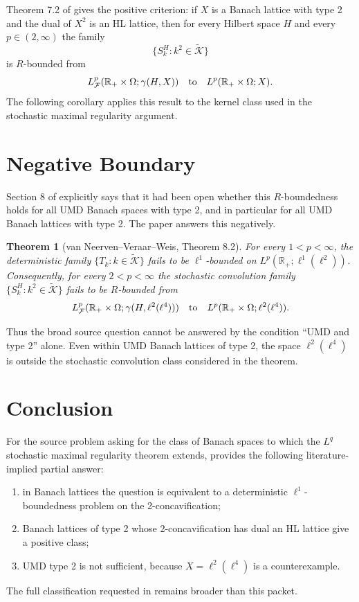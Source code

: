 \documentclass[11pt]{article}
\newtheorem{theorem}{Theorem}
\newcommand{\R}{\mathbb{R}}
\newcommand{\Ktilde}{\widetilde{\mathcal K}}
\begin{document}
Theorem 7.2 of \cite{NVWrbounded} gives the positive criterion: if $X$ is a
Banach lattice with type 2 and the dual of $X^2$ is an HL lattice, then for
every Hilbert space $H$ and every $p\in(2,\infty)$ the family
\[
  \{S_k^H : k^2\in \Ktilde\}
\]
is $R$-bounded from
\[
  L^p_{\mathcal F}(\R_+\times\Omega;\gamma(H,X))
  \quad\hbox{to}\quad
  L^p(\R_+\times\Omega;X).
\]
The following corollary applies this result to the kernel class used in the
stochastic maximal regularity argument.

\section*{Negative Boundary}

Section 8 of \cite{NVWrbounded} explicitly says that it had been open whether
this $R$-boundedness holds for all UMD Banach spaces with type 2, and in
particular for all UMD Banach lattices with type 2. The paper answers this
negatively.

\begin{theorem}[van Neerven--Veraar--Weis, Theorem 8.2]
For every $1<p<\infty$, the deterministic family
$\{T_k:k\in\Ktilde\}$ fails to be $\ell^1$-bounded on
$L^p(\R_+;\ell^1(\ell^2))$. Consequently, for every $2<p<\infty$ the
stochastic convolution family $\{S_k^H:k^2\in\Ktilde\}$ fails to be
$R$-bounded from
\[
  L^p_{\mathcal F}(\R_+\times\Omega;\gamma(H,\ell^2(\ell^4)))
  \quad\hbox{to}\quad
  L^p(\R_+\times\Omega;\ell^2(\ell^4)).
\]
\end{theorem}

Thus the broad source question cannot be answered by the condition ``UMD and
type 2'' alone. Even within UMD Banach lattices of type 2, the space
$\ell^2(\ell^4)$ is outside the stochastic convolution class considered in
the theorem.

\section*{Conclusion}

For the source problem asking for the class of Banach spaces to which the
$L^q$ stochastic maximal regularity theorem extends, \cite{NVWrbounded}
provides the following literature-implied partial answer:
\begin{enumerate}
  \item in Banach lattices the question is equivalent to a deterministic
  $\ell^1$-boundedness problem on the 2-concavification;
  \item Banach lattices of type 2 whose 2-concavification has dual an HL
  lattice give a positive class;
  \item UMD type 2 is not sufficient, because $X=\ell^2(\ell^4)$ is a
  counterexample.
\end{enumerate}
The full classification requested in \cite{NVWsurvey} remains broader than
this packet.
\end{document}
